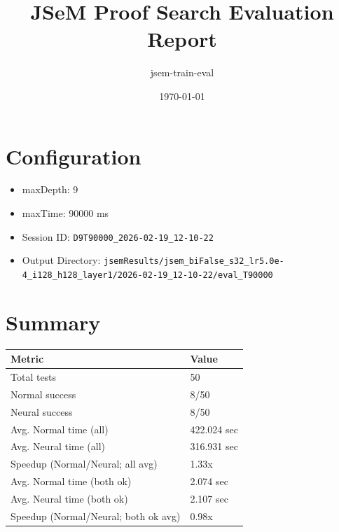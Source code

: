 \documentclass[a4paper,10pt]{article}
\title{JSeM Proof Search Evaluation Report}
\author{jsem-train-eval}
\date{\today}
\begin{document}
\maketitle

\section{Configuration}
\begin{itemize}
\item maxDepth: 9
\item maxTime: 90000 ms
\item Session ID: \texttt{D9T90000\_2026-02-19\_12-10-22}
\item Output Directory: \texttt{jsemResults/jsem\_biFalse\_s32\_lr5.0e-4\_i128\_h128\_layer1/2026-02-19\_12-10-22/eval\_T90000}
\end{itemize}

\section{Summary}
\begin{tabular}{ll}
\toprule
\textbf{Metric} & \textbf{Value} \\
\midrule
Total tests & 50 \\
Normal success & 8/50 \\
Neural success & 8/50 \\
\midrule
Avg. Normal time (all) & 422.024 sec \\
Avg. Neural time (all) & 316.931 sec \\
Speedup (Normal/Neural; all avg) & 1.33x \\
Avg. Normal time (both ok) & 2.074 sec \\
Avg. Neural time (both ok) & 2.107 sec \\
Speedup (Normal/Neural; both ok avg) & 0.98x \\
\bottomrule
\end{tabular}
\end{document}
